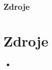\documentclass[aspectratio=43]{beamer}
\title{}
\subtitle{}
\author{Havránek Kryštof 4.E}
\date{}
\institute{Gymnázium, Praha 6, Arabská 14}
\begin{document}
\begin{frame}[plain]
	\maketitle
\end{frame}

\clearpage
\setcounter{framenumber}{0}


\appendix
\begin{frame}[plain]
	\frametitle{Zdroje}
	\section{Zdroje}
	\changefontsizes{7pt}
	\begin{itemize}
		\item
	\end{itemize}
\end{frame}
\end{document}
